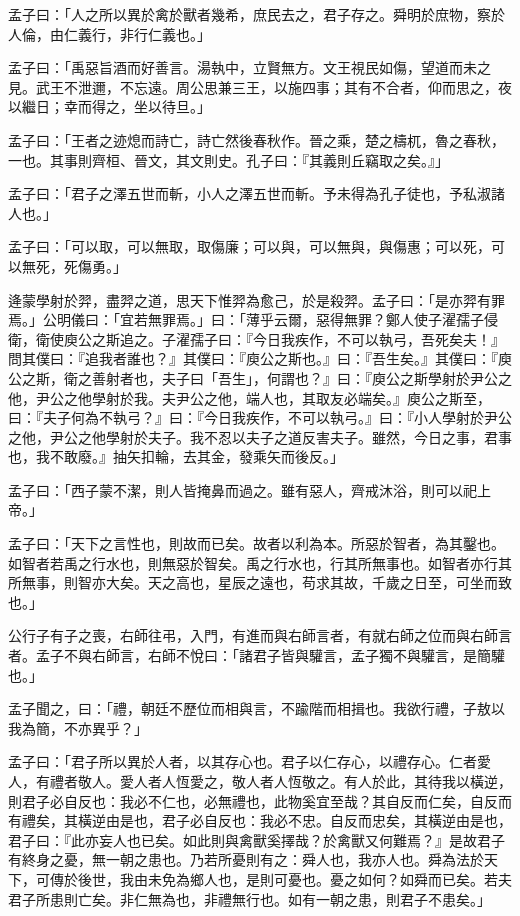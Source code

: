 \begin{pinyinscope}
孟子曰：「人之所以異於禽於獸者幾希，庶民去之，君子存之。舜明於庶物，察於人倫，由仁義行，非行仁義也。」

孟子曰：「禹惡旨酒而好善言。湯執中，立賢無方。文王視民如傷，望道而未之見。武王不泄邇，不忘遠。周公思兼三王，以施四事；其有不合者，仰而思之，夜以繼日；幸而得之，坐以待旦。」

孟子曰：「王者之迹熄而詩亡，詩亡然後春秋作。晉之乘，楚之檮杌，魯之春秋，一也。其事則齊桓、晉文，其文則史。孔子曰：『其義則丘竊取之矣。』」

孟子曰：「君子之澤五世而斬，小人之澤五世而斬。予未得為孔子徒也，予私淑諸人也。」

孟子曰：「可以取，可以無取，取傷廉；可以與，可以無與，與傷惠；可以死，可以無死，死傷勇。」

逄蒙學射於羿，盡羿之道，思天下惟羿為愈己，於是殺羿。孟子曰：「是亦羿有罪焉。」公明儀曰：「宜若無罪焉。」曰：「薄乎云爾，惡得無罪？鄭人使子濯孺子侵衛，衛使庾公之斯追之。子濯孺子曰：『今日我疾作，不可以執弓，吾死矣夫！』問其僕曰：『追我者誰也？』其僕曰：『庾公之斯也。』曰：『吾生矣。』其僕曰：『庾公之斯，衛之善射者也，夫子曰「吾生」，何謂也？』曰：『庾公之斯學射於尹公之他，尹公之他學射於我。夫尹公之他，端人也，其取友必端矣。』庾公之斯至，曰：『夫子何為不執弓？』曰：『今日我疾作，不可以執弓。』曰：『小人學射於尹公之他，尹公之他學射於夫子。我不忍以夫子之道反害夫子。雖然，今日之事，君事也，我不敢廢。』抽矢扣輪，去其金，發乘矢而後反。」

孟子曰：「西子蒙不潔，則人皆掩鼻而過之。雖有惡人，齊戒沐浴，則可以祀上帝。」

孟子曰：「天下之言性也，則故而已矣。故者以利為本。所惡於智者，為其鑿也。如智者若禹之行水也，則無惡於智矣。禹之行水也，行其所無事也。如智者亦行其所無事，則智亦大矣。天之高也，星辰之遠也，苟求其故，千歲之日至，可坐而致也。」

公行子有子之喪，右師往弔，入門，有進而與右師言者，有就右師之位而與右師言者。孟子不與右師言，右師不悅曰：「諸君子皆與驩言，孟子獨不與驩言，是簡驩也。」

孟子聞之，曰：「禮，朝廷不歷位而相與言，不踰階而相揖也。我欲行禮，子敖以我為簡，不亦異乎？」

孟子曰：「君子所以異於人者，以其存心也。君子以仁存心，以禮存心。仁者愛人，有禮者敬人。愛人者人恆愛之，敬人者人恆敬之。有人於此，其待我以橫逆，則君子必自反也：我必不仁也，必無禮也，此物奚宜至哉？其自反而仁矣，自反而有禮矣，其橫逆由是也，君子必自反也：我必不忠。自反而忠矣，其橫逆由是也，君子曰：『此亦妄人也已矣。如此則與禽獸奚擇哉？於禽獸又何難焉？』是故君子有終身之憂，無一朝之患也。乃若所憂則有之：舜人也，我亦人也。舜為法於天下，可傳於後世，我由未免為鄉人也，是則可憂也。憂之如何？如舜而已矣。若夫君子所患則亡矣。非仁無為也，非禮無行也。如有一朝之患，則君子不患矣。」


\end{pinyinscope}
